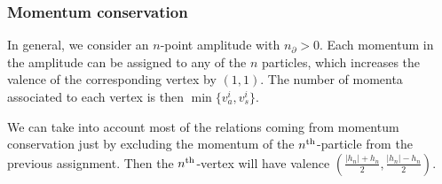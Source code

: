 \documentclass[aps,prd,nofootinbib,twocolumn,10pt]{revtex4-2}
\begin{document}

\subsubsection{Momentum conservation}

In general, we consider an $n$-point amplitude with $n_\partial > 0$. Each momentum in the amplitude can be assigned to any of the $n$ particles, which increases the valence of the corresponding vertex by $(1,1)$. The number of momenta associated to each vertex is then $\min\{v^i_a,v^i_s\}$.

We can take into account most of the relations coming from momentum conservation just by excluding the momentum of the $n^{\rm th}$-particle from the previous assignment. Then the $n^{\rm th}$-vertex will have valence $(\frac{|h_n|+h_n}{2},\frac{|h_n|-h_n}{2})$.
\end{document}
